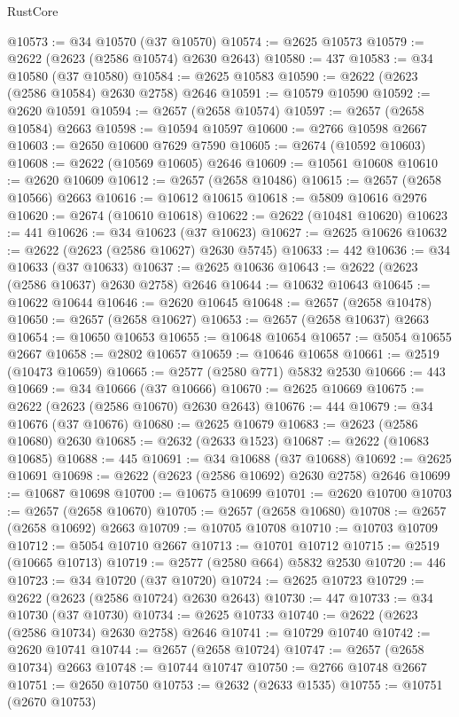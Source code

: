 \begin{lexlean}{RustCore}
\begin{coremodule}
@10573 := @34 @10570 (@37 @10570)
@10574 := @2625 @10573
@10579 := @2622 (@2623 (@2586 @10574) @2630 @2643)
@10580 := 437
@10583 := @34 @10580 (@37 @10580)
@10584 := @2625 @10583
@10590 := @2622 (@2623 (@2586 @10584) @2630 @2758) @2646
@10591 := @10579 @10590
@10592 := @2620 @10591
@10594 := @2657 (@2658 @10574)
@10597 := @2657 (@2658 @10584) @2663
@10598 := @10594 @10597
@10600 := @2766 @10598 @2667
@10603 := @2650 @10600 @7629 @7590
@10605 := @2674 (@10592 @10603)
@10608 := @2622 (@10569 @10605) @2646
@10609 := @10561 @10608
@10610 := @2620 @10609
@10612 := @2657 (@2658 @10486)
@10615 := @2657 (@2658 @10566) @2663
@10616 := @10612 @10615
@10618 := @5809 @10616 @2976
@10620 := @2674 (@10610 @10618)
@10622 := @2622 (@10481 @10620)
@10623 := 441
@10626 := @34 @10623 (@37 @10623)
@10627 := @2625 @10626
@10632 := @2622 (@2623 (@2586 @10627) @2630 @5745)
@10633 := 442
@10636 := @34 @10633 (@37 @10633)
@10637 := @2625 @10636
@10643 := @2622 (@2623 (@2586 @10637) @2630 @2758) @2646
@10644 := @10632 @10643
@10645 := @10622 @10644
@10646 := @2620 @10645
@10648 := @2657 (@2658 @10478)
@10650 := @2657 (@2658 @10627)
@10653 := @2657 (@2658 @10637) @2663
@10654 := @10650 @10653
@10655 := @10648 @10654
@10657 := @5054 @10655 @2667
@10658 := @2802 @10657
@10659 := @10646 @10658
@10661 := @2519 (@10473 @10659)
@10665 := @2577 (@2580 @771) @5832 @2530
@10666 := 443
@10669 := @34 @10666 (@37 @10666)
@10670 := @2625 @10669
@10675 := @2622 (@2623 (@2586 @10670) @2630 @2643)
@10676 := 444
@10679 := @34 @10676 (@37 @10676)
@10680 := @2625 @10679
@10683 := @2623 (@2586 @10680) @2630
@10685 := @2632 (@2633 @1523)
@10687 := @2622 (@10683 @10685)
@10688 := 445
@10691 := @34 @10688 (@37 @10688)
@10692 := @2625 @10691
@10698 := @2622 (@2623 (@2586 @10692) @2630 @2758) @2646
@10699 := @10687 @10698
@10700 := @10675 @10699
@10701 := @2620 @10700
@10703 := @2657 (@2658 @10670)
@10705 := @2657 (@2658 @10680)
@10708 := @2657 (@2658 @10692) @2663
@10709 := @10705 @10708
@10710 := @10703 @10709
@10712 := @5054 @10710 @2667
@10713 := @10701 @10712
@10715 := @2519 (@10665 @10713)
@10719 := @2577 (@2580 @664) @5832 @2530
@10720 := 446
@10723 := @34 @10720 (@37 @10720)
@10724 := @2625 @10723
@10729 := @2622 (@2623 (@2586 @10724) @2630 @2643)
@10730 := 447
@10733 := @34 @10730 (@37 @10730)
@10734 := @2625 @10733
@10740 := @2622 (@2623 (@2586 @10734) @2630 @2758) @2646
@10741 := @10729 @10740
@10742 := @2620 @10741
@10744 := @2657 (@2658 @10724)
@10747 := @2657 (@2658 @10734) @2663
@10748 := @10744 @10747
@10750 := @2766 @10748 @2667
@10751 := @2650 @10750
@10753 := @2632 (@2633 @1535)
@10755 := @10751 (@2670 @10753)

\end{coremodule}
\end{lexlean}
